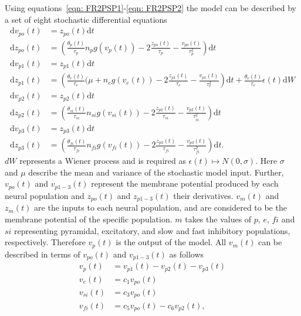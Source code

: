 Using equations~\ref{eqn: FR2PSP1}-\ref{eqn: FR2PSP2} the model can be described by a set of eight stochastic differential equations \begin{align}%
\mathrm{d}v_{po}(t)&= z_{po}(t)\mathrm{d}t\\
\mathrm{d}z_{po}(t)&=\left(\frac{\theta_{p}(t)}{\tau_{p}}n_{p}g(v_{p}(t))-2\frac{z_{po}(t)}{\tau_{p}}-\frac{v_{po}(t)}{\tau_{p}^{2}}\right)\mathrm{d}t\\
\mathrm{d}v_{p1}(t)&= z_{p1}(t)\mathrm{d}t\\
\mathrm{d}z_{p1}(t)&=\left(\frac{\theta_{e}(t)}{\tau_{e}}(\mu +n_{e}g(v_{e}(t))-2\frac{z_{p1}(t)}{\tau_{e}}-\frac{v_{p1}(t)}{\tau_{e}^{2}}\right)\mathrm{d}t + \frac{\theta_{e}(t)}{\tau_{e}}\epsilon(t)\mathrm{d}W\\
\mathrm{d}v_{p2}(t)&= z_{p2}(t)\mathrm{d}t\\
\mathrm{d}z_{p2}(t)&=\left(\frac{\theta_{si}(t)}{\tau_{si}}n_{si}g(v_{si}(t))-2\frac{z_{p2}(t)}{\tau_{si}}-\frac{v_{p2}(t)}{\tau_{si}^{2}}\right)\mathrm{d}t\\
\mathrm{d}v_{p3}(t)&= z_{p3}(t)\mathrm{d}t\\
\mathrm{d}z_{p3}(t)&=\left(\frac{\theta_{fi}(t)}{\tau_{fi}}n_{fi}g(v_{fi}(t))-2\frac{z_{p3}(t)}{\tau_{fi}}-\frac{v_{p3}(t)}{\tau_{fi}^{2}}\right)\mathrm{d}t.
\end{align} $dW$ represents a Wiener process and is required as $\epsilon(t)\longmapsto N(0,\sigma)$. Here $\sigma$ and $\mu$ describe the mean and variance of the stochastic model input. Further, $v_{po}(t) $ and $v_{p1-3}(t)$ represent the membrane potential produced by each neural population and $z_{po}(t) $ and $z_{p1-3}(t)$ their derivatives. $v_{m}(t) $ and $z_{m}(t) $ are the inputs to each neural population, and are considered to be the membrane potential of the specific population. $m$ takes the values of $p$, $e$, $fi$ and $si$ representing pyramidal, excitatory, and slow and fast inhibitory populations, respectively. Therefore $v_{p}(t) $ is the output of the model. All $v_{m}(t) $ can be described in terms of $v_{po}(t)$ and $v_{p1-3}(t)$ as follows \begin{align}%
v_{p}(t) &= v_{p1}(t)-v_{p2}(t)-v_{p3}(t)\\
v_{e}(t) &= c_{1}v_{po}(t)\\
v_{si}(t) &= c_{3}v_{po}(t)\\
v_{fi}(t) &= c_{5}v_{po}(t)-c_{6}v_{p2}(t),

\end{align}
